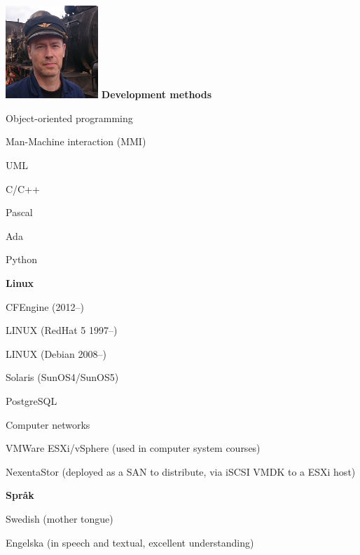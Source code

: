 \documentclass[a4paper,swedish,10pt]{article}
\begin{document}
\begin{minipage}[t]{0.24\textwidth}%
  \raggedleft%
  \vspace{-\topskip+1cm}
  \includegraphics[height=3.5cm]{bild.jpg}
  \textbf{Development methods}
  \begin{description}[nosep]
    \raggedleft\setlength\itemsep{0.1ex}\small%
  \item Object-oriented programming
  \item Man-Machine interaction (MMI)
  \item UML
  \item C/C++
  \item Pascal
  \item Ada
  \item Python
  \end{description}
  \vspace{0.5cm}
  \textbf{Linux}
  \begin{description}[nosep,font=\sffamily\bfseries]
    \raggedleft\setlength\itemsep{0.1ex}\small%
  \item CFEngine (2012--)
  \item LINUX (RedHat 5 1997--)
  \item LINUX (Debian 2008--)
  \item Solaris (SunOS4/SunOS5)
  \item PostgreSQL
  \item Computer networks
  \item VMWare ESXi/vSphere (used in computer system courses)
  \item NexentaStor (deployed as a SAN to distribute, via iSCSI VMDK to a ESXi host)
  \end{description}
  \vspace{0.5cm}
  \textbf{Språk}
  \begin{description}[nosep,itemsep=0.1ex]
    \raggedleft\small%
  \item Swedish (mother tongue)
  \item Engelska (in speech and textual, excellent understanding)
  \end{description}
\end{minipage}
\end{document}
